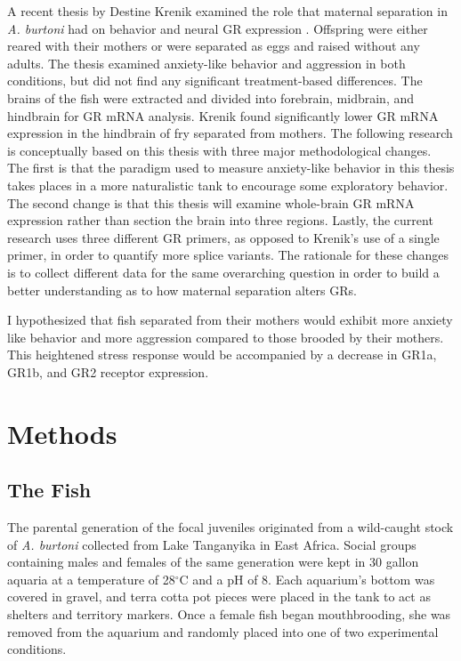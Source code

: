 \documentclass[12pt,twoside]{reedthesis}
\begin{document}
A recent thesis by Destine Krenik examined the role that maternal separation in
\textit{A. burtoni} had on behavior and neural GR
expression \citep{KrenikDestine2018Teom}. Offspring were either reared with their mothers or were separated as
eggs and raised without any adults. The thesis examined anxiety-like behavior and aggression in both
conditions, but did not find any significant treatment-based differences. The
brains of the fish were extracted and divided into forebrain, midbrain, and hindbrain for
GR mRNA analysis. Krenik found significantly lower GR mRNA expression in
the hindbrain of fry separated from mothers. The following research is
conceptually based on this thesis with three major methodological changes. The
first is that the paradigm used to measure anxiety-like behavior in this thesis takes places in
a more naturalistic tank to encourage some exploratory behavior. The second change is that this thesis will examine
whole-brain GR mRNA expression rather than section the brain into three regions.
Lastly,
the current research uses three different GR primers, as opposed to Krenik's use
of a single primer, in order to quantify
more splice variants. The rationale for these changes is to collect different
data for the same overarching question in order to build a better understanding
as to how
maternal separation alters GRs.

I hypothesized that fish separated from their mothers would exhibit more anxiety
like behavior and more aggression compared to those brooded by their mothers.
This heightened stress response would be accompanied by a decrease in GR1a,
GR1b, and GR2 receptor expression.

\chapter{Methods}
\section{The Fish}

The parental generation of the focal juveniles originated from a wild-caught
stock of \textit{A. burtoni} collected from Lake Tanganyika in East Africa.
Social groups containing males and females of the same generation were kept in
30 gallon aquaria at a temperature of 28$^\circ$C and a pH of 8. Each aquarium's bottom
was covered in gravel, and terra cotta pot pieces were placed in the tank to act
as shelters and territory markers. Once a female fish began mouthbrooding, she
was removed from the aquarium and randomly placed into one of two experimental
conditions.
\end{document}
